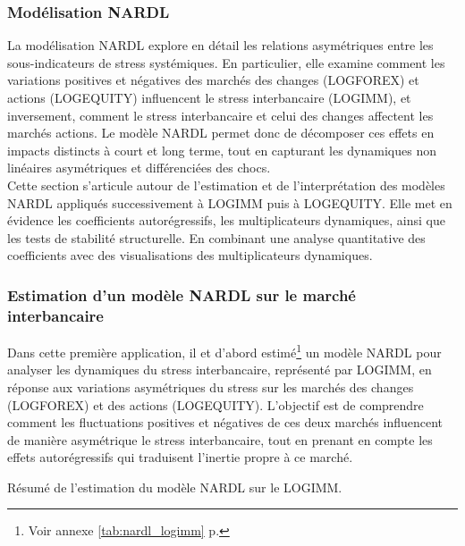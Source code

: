 \subsubsection{Modélisation NARDL}

La modélisation NARDL explore en détail les relations asymétriques entre les sous-indicateurs de stress systémiques. En particulier, elle examine comment les variations positives et négatives des marchés des changes (LOGFOREX) et actions (LOGEQUITY) influencent le stress interbancaire (LOGIMM), et inversement, comment le stress interbancaire et celui des changes affectent les marchés actions. Le modèle NARDL permet donc de décomposer ces effets en impacts distincts à court et long terme, tout en capturant les dynamiques non linéaires asymétriques et différenciées des chocs.\\

Cette section s’articule autour de l’estimation et de l’interprétation des modèles NARDL appliqués successivement à LOGIMM puis à LOGEQUITY. Elle met en évidence les coefficients autorégressifs, les multiplicateurs dynamiques, ainsi que les tests de stabilité structurelle. En combinant une analyse quantitative des coefficients avec des visualisations des multiplicateurs dynamiques.

\subsubsection{Estimation d'un modèle NARDL sur le marché interbancaire}

Dans cette première application, il et d'abord estimé\footnote{Voir annexe \ref{tab:nardl_logimm} p.\pageref{tab:nardl_logimm}} un modèle NARDL pour analyser les dynamiques du stress interbancaire, représenté par LOGIMM, en réponse aux variations asymétriques du stress sur les marchés des changes (LOGFOREX) et des actions (LOGEQUITY). L’objectif est de comprendre comment les fluctuations positives et négatives de ces deux marchés influencent de manière asymétrique le stress interbancaire, tout en prenant en compte les effets autorégressifs qui traduisent l’inertie propre à ce marché.

\begin{table}[H]
    \centering
    \sffamily
    \caption{Résumé de l'estimation du modèle NARDL sur le LOGIMM.}
    \label{tab:estimation_ms_arx}
    
\end{table}

\vspace{0.5cm}

